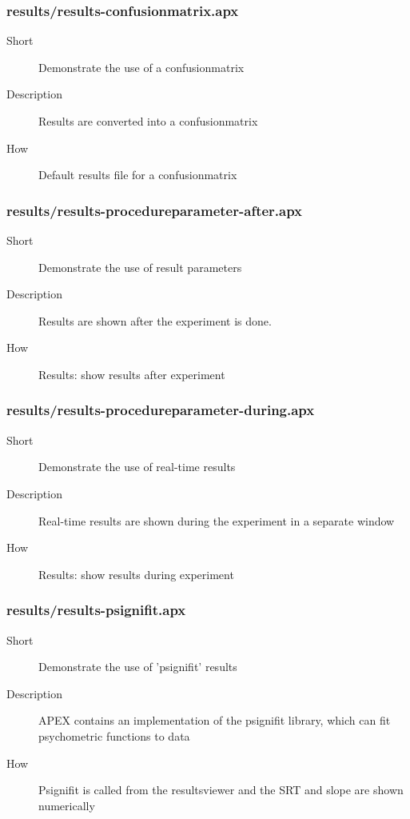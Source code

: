 \subsubsection{results/results-confusionmatrix.apx}
\begin{description}
\item[Short] 
 Demonstrate the use of a confusionmatrix
\item[Description] 
 Results are converted into a confusionmatrix
\item[How] 
 Default results file for a confusionmatrix
\end{description}

\subsubsection{results/results-procedureparameter-after.apx}
\begin{description}
\item[Short] 
 Demonstrate the use of result parameters
\item[Description] 
 Results are shown after the experiment is done.
\item[How] 
 Results: show results after experiment
\end{description}

\subsubsection{results/results-procedureparameter-during.apx}
\begin{description}
\item[Short] 
 Demonstrate the use of real-time results
\item[Description] 
 Real-time results are shown during the experiment in a separate window
\item[How] 
 Results: show results during experiment
\end{description}

\subsubsection{results/results-psignifit.apx}
\begin{description}
\item[Short] 
 Demonstrate the use of 'psignifit' results
\item[Description] 
 APEX contains an implementation of the psignifit library, which can fit psychometric functions to data
\item[How] 
 Psignifit is called from the resultsviewer and the SRT and slope are shown numerically
\end{description}

